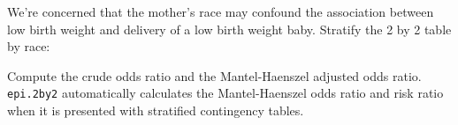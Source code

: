 \documentclass[
]{article}
\newenvironment{Shaded}{\begin{snugshade}}{\end{snugshade}}
\newcommand{\CommentTok}[1]{\textcolor[rgb]{0.56,0.35,0.01}{\textit{#1}}}
\newcommand{\DataTypeTok}[1]{\textcolor[rgb]{0.13,0.29,0.53}{#1}}
\newcommand{\KeywordTok}[1]{\textcolor[rgb]{0.13,0.29,0.53}{\textbf{#1}}}
\newcommand{\NormalTok}[1]{#1}
\newcommand{\OperatorTok}[1]{\textcolor[rgb]{0.81,0.36,0.00}{\textbf{#1}}}
\newcommand{\StringTok}[1]{\textcolor[rgb]{0.31,0.60,0.02}{#1}}
\begin{document}
We're concerned that the mother's race may confound the association
between low birth weight and delivery of a low birth weight baby.
Stratify the 2 by 2 table by race:

\begin{Shaded}
\end{Shaded}

Compute the crude odds ratio and the Mantel-Haenszel adjusted odds
ratio. \texttt{epi.2by2} automatically calculates the Mantel-Haenszel
odds ratio and risk ratio when it is presented with stratified
contingency tables.
\end{document}
